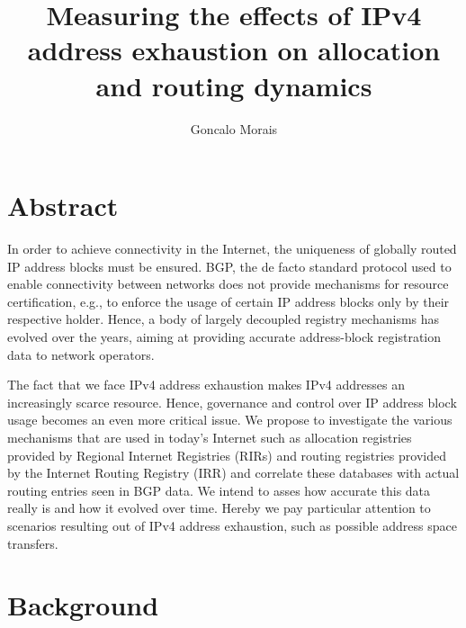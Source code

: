 \documentclass[11pt,a4paper]{scrreprt}
\title{\textbf{Measuring the effects of IPv4 address exhaustion on allocation and routing dynamics}}
\author{Goncalo Morais}
\date{}
\begin{document}
\maketitle

\tableofcontents
\listoffigures
\listoftables

\setcounter{chapter}{0}


\chapter*{Abstract}
In order to achieve connectivity in the Internet, the uniqueness of
globally routed IP address blocks must be ensured. BGP, the de facto
standard protocol used to enable connectivity between networks does not
provide mechanisms for resource certification, e.g., to enforce the
usage of certain IP address blocks only by their respective holder.
Hence, a body of largely decoupled registry mechanisms has evolved over
the years, aiming at providing accurate address-block registration data
to network operators.

The fact that we face IPv4 address exhaustion makes IPv4 addresses an
increasingly scarce resource. Hence, governance and control over IP
address block usage becomes an even more critical issue. We propose to
investigate the various mechanisms that are used in today's Internet
such as allocation registries provided by Regional Internet Registries
(RIRs) and routing registries provided by the Internet Routing Registry
(IRR) and correlate these databases with actual routing entries seen in
BGP data. We intend to asses how accurate this data really is and how it
evolved over time. Hereby we pay particular attention to scenarios
resulting out of IPv4 address exhaustion, such as possible address space
transfers.


\chapter{Background}
\end{document}
